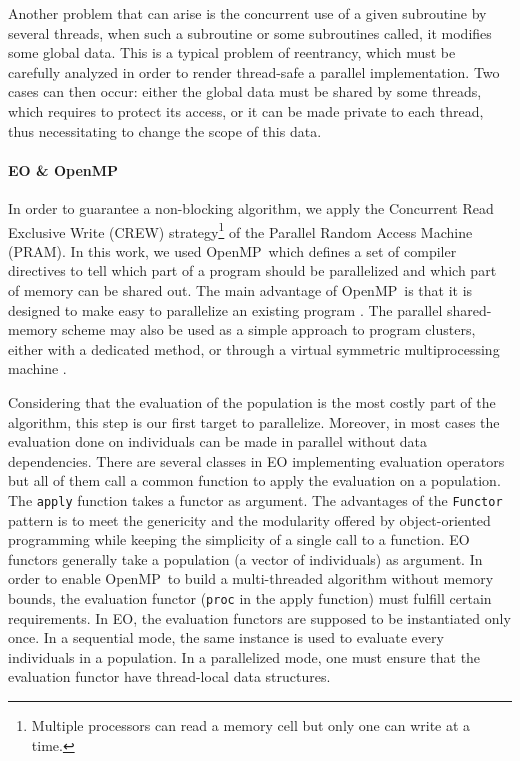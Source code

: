 \documentclass{sig-alternate}
\newcommand{\OPENMP}{{\sc OpenMP}}
\begin{document}
Another problem that can arise is the concurrent use of a given subroutine by
several threads, when such a subroutine or some subroutines called, it modifies
some global data. This is a typical problem of reentrancy, which must be
carefully analyzed in order to render thread-safe a parallel implementation. Two
cases can then occur: either the global data must be shared by some threads, which
requires to protect its access, or it can be made private to each thread, thus
necessitating to change the scope of this data.

\paragraph{EO \& OpenMP}
In order to guarantee a non-blocking algorithm, we apply the Concurrent Read Exclusive Write (CREW) strategy\footnote{Multiple processors can read a memory cell but only one can write at a time.} of the Parallel Random Access Machine (PRAM).
In this work, we used \OPENMP\ which defines a set of compiler directives to tell which part of a program should be parallelized and which part of memory can be shared out. 
The main advantage of \OPENMP\ is that it is designed to make easy to parallelize an existing program \cite{special:parallelComputing2005}. The parallel shared-memory scheme may also be used as a simple approach to program clusters, either with a dedicated method, or through a virtual symmetric multiprocessing machine \cite{Huang:openmpGlobalArrays2005}.

Considering that the evaluation of the population is the most costly part of the
algorithm, this step is our first target to parallelize. Moreover, in most cases
the evaluation done on individuals can be made in parallel without data
dependencies. There are several classes in EO implementing evaluation operators
but all of them call a common function to apply the evaluation on a population. The {\tt apply} function takes a functor as argument.
The advantages of the {\tt Functor} pattern is to meet the genericity and the modularity offered by
object-oriented programming while keeping the simplicity of a single call to a function. EO functors
generally take a population (a vector of individuals) as argument.
In order to enable \OPENMP\ to build a multi-threaded algorithm without memory bounds, the evaluation functor ({\tt proc} in the apply function) must
fulfill certain requirements. In EO, the evaluation functors are supposed to be
instantiated only once. In a sequential mode, the same instance is used to
evaluate every individuals in a population. In a parallelized mode, one must
ensure that the evaluation functor have thread-local data structures.
\end{document}
